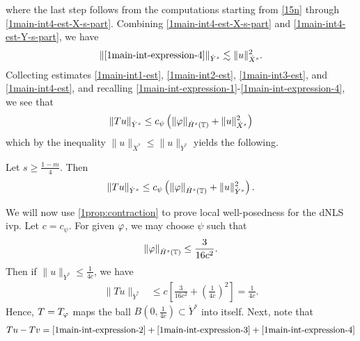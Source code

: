 %
%
where the last step follows from the computations starting from \eqref{15n}
through \eqref{1main-int4-est-X-s-part}.
Combining \eqref{1main-int4-est-X-s-part} and \eqref{1main-int4-est-Y-s-part}, we
have
%
%
\begin{equation}
\label{1main-int4-est}
	\begin{split}
		\|\eqref{1main-int-expression-4}\|_{\dot{Y}^s} \lesssim \|u\|_{\dot{X}^s}^2.
	\end{split}
\end{equation}
%
%
Collecting estimates \eqref{1main-int1-est}, \eqref{1main-int2-est}, 
\eqref{1main-int3-est}, and \eqref{1main-int4-est}, and recalling 
\eqref{1main-int-expression-1}-\eqref{1main-int-expression-4}, we see that
$$\|Tu\|_{\dot{Y}^s} \le c_\psi \left( \|\varphi \|_{\dot{H}^s(\mathbb{T})} + \|u\|_{\dot{X}^s}^2 \right )$$ 
which by the inequality $\|u\|_{\dot{X}^s} \le \|u\|_{\dot{Y}^s}$ yields the following.
%
%				 
%
\begin{proposition}
\label{1prop:contraction}
Let $s \ge \frac{1-m}{4}$. Then
%
\begin{equation*}
	\begin{split}
		\|Tu\|_{\dot{Y}^s} \le c_\psi \left( \|\varphi \|_{\dot{H}^s(\mathbb{T})} + \|u\|_{\dot{Y}^s}^2 
		\right).
	\end{split}
\end{equation*}
%
\end{proposition}
We will now use \cref{1prop:contraction} to prove local well-posedness for the 
dNLS ivp. Let $c = c_{\psi}$. For given $\varphi$, we may choose $\psi$ such
that 
%
\begin{equation*}
	\begin{split}
		\|\varphi\|_{\dot{H}^s(\mathbb{T})} \le \frac{3}{16c^2}.
	\end{split}
\end{equation*}
%
Then if $\|u\|_{\dot{Y}^s} \le \frac{1}{4c}$, we have
%
\begin{equation*}
	\begin{split}
		\|T u \|_{\dot{Y}^s} 
		& \le c \left[ \frac{3}{16c^2} + \left( 
		\frac{1}{4c} \right)^2 \right]
		=  \frac{1}{4c}.
	\end{split}
\end{equation*}
%
Hence, $T=T_{\varphi}$ maps the ball $B\left( 0, \frac{1}{4c} \right) \subset \dot{Y}^s$ into 
itself. Next, note that
%
\begin{equation*}
	\begin{split}
		Tu - Tv = \eqref{1main-int-expression-2} + \eqref{1main-int-expression-3} 
		+ \eqref{1main-int-expression-4}
	\end{split}
\end{equation*}
